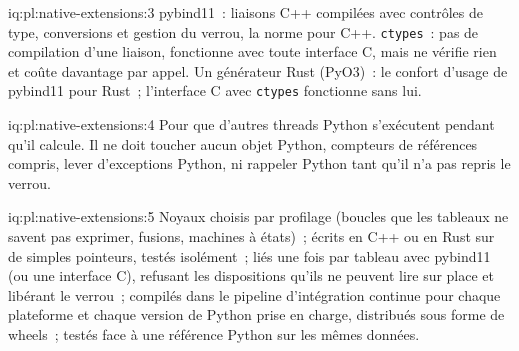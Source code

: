 \begin{solution}{iq:pl:native-extensions:3}
pybind11~: liaisons C++ compilées avec contrôles de type, conversions et gestion du verrou, la norme pour C++. \texttt{ctypes}~: pas de compilation d'une
liaison, fonctionne avec toute interface C, mais ne vérifie rien et coûte davantage par appel. Un générateur Rust (PyO3)~: le confort d'usage de pybind11 pour Rust~;
l'interface C avec \texttt{ctypes} fonctionne sans lui.
\end{solution}

\begin{solution}{iq:pl:native-extensions:4}
Pour que d'autres threads Python s'exécutent pendant qu'il calcule. Il ne doit toucher aucun objet Python, compteurs de références compris, lever
d'exceptions Python, ni rappeler Python tant qu'il n'a pas repris le verrou.
\end{solution}

\begin{solution}{iq:pl:native-extensions:5}
Noyaux choisis par profilage (boucles que les tableaux ne savent pas exprimer, fusions, machines à états)~; écrits en C++ ou en Rust sur de simples pointeurs, testés
isolément~; liés une fois par tableau avec pybind11 (ou une interface C), refusant les dispositions qu'ils ne peuvent lire sur place et libérant le verrou~; compilés dans
le pipeline d'intégration continue pour chaque plateforme et chaque version de Python prise en charge, distribués sous forme de wheels~; testés face à une
référence Python sur les mêmes données.
\end{solution}
